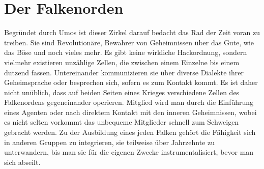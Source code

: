 \documentclass[a4paper,12pt,oneside]{book}
\begin{document}
\section{Der Falkenorden}
Begründet durch Umos ist dieser Zirkel darauf bedacht das Rad der Zeit voran zu treiben. Sie sind Revolutionäre, Bewahrer von Geheimnissen über das Gute, wie das Böse und noch vieles mehr. Es gibt keine wirkliche Hackordnung, sondern vielmehr existieren unzählige Zellen, die zwischen einem Einzelne bis einem dutzend fassen. Untereinander kommunizieren sie über diverse Dialekte ihrer Geheimsprache oder besprechen sich, sofern es zum Kontakt kommt. Es ist daher nicht unüblich, dass auf beiden Seiten eines Krieges verschiedene Zellen des Falkenordens gegeneinander operieren. Mitglied wird man durch die Einführung eines Agenten oder nach direktem Kontakt mit den inneren Geheimnissen, wobei es nicht selten vorkommt das unbequeme Mitglieder schnell zum Schweigen gebracht werden. Zu der Ausbildung eines jeden Falken gehört die Fähigkeit sich in anderen Gruppen zu integrieren, sie teilweise über Jahrzehnte zu unterwandern, bis man sie für die eigenen Zwecke instrumentalisiert, bevor man sich abseilt. 
\end{document}
